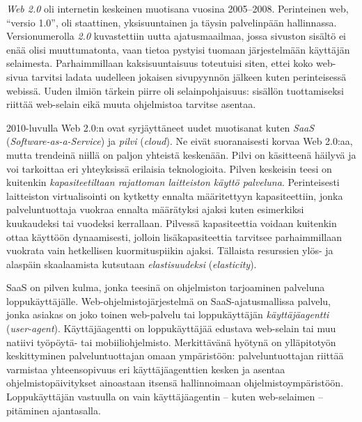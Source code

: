 \documentclass[finnish,gradu]{tktltiki}
\begin{document}
  \emph{Web 2.0} oli internetin keskeinen muotisana vuosina 2005--2008. Perinteinen web, ``versio 1.0'', oli staattinen, yksisuuntainen ja täysin palvelinpään hallinnassa. Versionumerolla \emph{2.0} kuvastettiin uutta ajatusmaailmaa, jossa sivuston sisältö ei enää olisi muuttumatonta, vaan tietoa pystyisi tuomaan järjestelmään käyttäjän selaimesta. Parhaimmillaan kaksisuuntaisuus toteutuisi siten, ettei koko web-sivua tarvitsi ladata uudelleen jokaisen sivupyynnön jälkeen kuten perinteisessä webissä. Uuden ilmiön tärkein piirre oli selainpohjaisuus: sisällön tuottamiseksi riittää web-selain eikä muuta ohjelmistoa tarvitse asentaa.

  2010-luvulla Web 2.0:n ovat syrjäyttäneet uudet muotisanat kuten \emph{SaaS} (\emph{Software-as-a-Service}) ja \emph{pilvi} (\emph{cloud}). Ne eivät suoranaisesti korvaa Web 2.0:aa, mutta trendeinä niillä on paljon yhteistä keskenään. Pilvi on käsitteenä häilyvä ja voi tarkoittaa eri yhteyksissä erilaisia teknologioita. Pilven keskeisin teesi on kuitenkin \emph{kapasiteetiltaan rajattoman laitteiston käyttö palveluna}. Perinteisesti laitteiston virtualisointi on kytketty ennalta määritettyyn kapasiteettiin, jonka palveluntuottaja vuokraa ennalta määrätyksi ajaksi kuten esimerkiksi kuukaudeksi tai vuodeksi kerrallaan. Pilvessä kapasiteettia voidaan kuitenkin ottaa käyttöön dynaamisesti, jolloin lisäkapasiteettia tarvitsee parhaimmillaan vuokrata vain hetkellisen kuormituspiikin ajaksi. Tällaista resurssien ylös- ja alaspäin skaalaamista kutsutaan \emph{elastisuudeksi} (\emph{elasticity}).


  SaaS on pilven kulma, jonka teesinä on ohjelmiston tarjoaminen palveluna loppukäyttäjälle. Web-ohjelmistojärjestelmä on SaaS-ajatusmallissa palvelu, jonka asiakas on joko toinen web-palvelu tai loppukäyttäjän \emph{käyttäjäagentti} (\emph{user-agent}). Käyttäjäagentti on loppukäyttäjää edustava web-selain tai muu natiivi työpöytä- tai mobiiliohjelmisto. Merkittävänä hyötynä on ylläpitotyön keskittyminen palveluntuottajan omaan ympäristöön: palveluntuottajan riittää varmistaa yhteensopivuus eri käyttäjäagenttien kesken ja asentaa ohjelmistopäivitykset ainoastaan itsensä hallinnoimaan ohjelmistoympäristöön. Loppukäyttäjän vastuulla on vain käyttäjäagentin -- kuten web-selaimen -- pitäminen ajantasalla.
\end{document}
